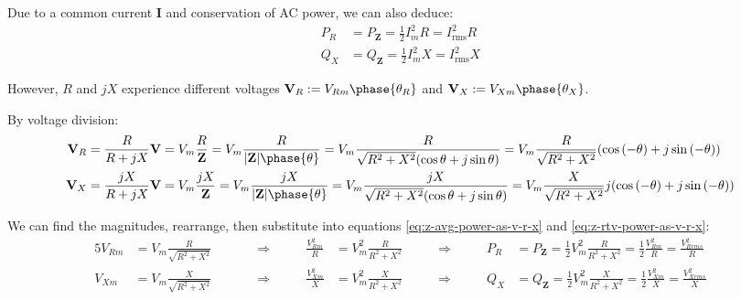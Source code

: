 \documentclass{article}
\begin{document}
Due to a common current $\mathbf{I}$ and conservation of AC power, we can also deduce:
\begin{subequations}
\begin{align*}
    P_R &= P_{\mathbf{Z}} = \frac{1}{2} I_m^2 R = I_{\text{rms}}^2 R \\
    Q_X &= Q_{\mathbf{Z}} = \frac{1}{2} I_m^2 X = I_{\text{rms}}^2 X
\end{align*}
\end{subequations}

However, $R$ and $jX$ experience different voltages $\mathbf{V}_R := V_{Rm} \phase{\theta_R}$ and $\mathbf{V}_X := V_{Xm} \phase{\theta_X}$.

By voltage division:
\begin{align*}
    \mathbf{V}_R
        &= \frac{R}{R + jX} \mathbf{V}
        = V_m \frac{R}{\mathbf{Z}}
        = V_m \frac{R}{\abs*{\mathbf{Z}} \phase{\theta}}
        = V_m \frac{R}{\sqrt{R^2 + X^2} \parens*{\cos{\theta} + j \sin{\theta}}}
        = V_m \frac{R}{\sqrt{R^2 + X^2}} \parens*{\cos{(-\theta)} + j \sin{(-\theta)}}
        \\
    \mathbf{V}_X
        &= \frac{jX}{R + jX} \mathbf{V}
        = V_m \frac{jX}{\mathbf{Z}}
        = V_m \frac{jX}{\abs*{\mathbf{Z}} \phase{\theta}}
        = V_m \frac{jX}{\sqrt{R^2 + X^2} \parens*{\cos{\theta} + j \sin{\theta}}}
        = V_m \frac{X}{\sqrt{R^2 + X^2}} j \parens*{\cos{(-\theta)} + j \sin{(-\theta)}}
        \\
\end{align*}

We can find the magnitudes, rearrange, then substitute into equations \eqref{eq:z-avg-power-as-v-r-x} and \eqref{eq:z-rtv-power-as-v-r-x}:
\begin{alignat*}{5}
    V_{Rm} &= V_m \frac{R}{\sqrt{R^2 + X^2}} &
        \qquad & \Longrightarrow \qquad &
        \frac{V_{Rm}^2}{R} &= V_m^2 \frac{R}{R^2 + X^2}
        \qquad & \Longrightarrow \qquad &
        P_R &= P_{\mathbf{Z}} = \frac{1}{2} V_m^2 \frac{R}{R^2 + X^2} = \frac{1}{2} \frac{V_{Rm}^2}{R} = \frac{V_{Rrms}^2}{R}
        \\
    V_{Xm} &= V_m \frac{X}{\sqrt{R^2 + X^2}} &
        \qquad & \Longrightarrow \qquad &
        \frac{V_{Xm}^2}{X} &= V_m^2 \frac{X}{R^2 + X^2}
        \qquad & \Longrightarrow \qquad &
        Q_X &= Q_{\mathbf{Z}} = \frac{1}{2} V_m^2 \frac{X}{R^2 + X^2} = \frac{1}{2} \frac{V_{Xm}^2}{X} = \frac{V_{Xrms}^2}{X}
\end{alignat*}
\end{document}
